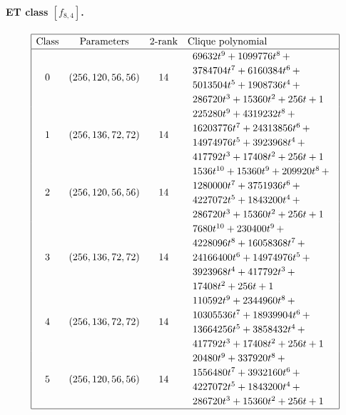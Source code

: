 \documentclass[12pt,a4paper]{article}
\begin{document}
\paragraph*{ET class $[f_{8,4}]$.}
\small{}
\begin{align*}
\def\arraystretch{1.2}
\begin{array}{|cccl|}
\hline
\text{Class} &
\text{Parameters} &
\text{2-rank} &
\text{Clique polynomial}
\\
\hline
0 &
(256, 120, 56, 56) &
14 &
\begin{array}{l}
69632t^{9} + 1099776t^{8}
\,+
\\
 3784704t^{7} + 6160384t^{6}
\,+
\\
 5013504t^{5} + 1908736t^{4}
\,+
\\
 286720t^{3} + 15360t^{2} + 256t + 1
\end{array}
\\
1 &
(256, 136, 72, 72) &
14 &
\begin{array}{l}
225280t^{9} + 4319232t^{8}
\,+
\\
 16203776t^{7} + 24313856t^{6}
\,+
\\
 14974976t^{5} + 3923968t^{4}
\,+
\\
 417792t^{3} + 17408t^{2} + 256t + 1
\end{array}
\\
2 &
(256, 120, 56, 56) &
14 &
\begin{array}{l}
1536t^{10} + 15360t^{9} + 209920t^{8}
\,+
\\
 1280000t^{7} + 3751936t^{6}
\,+
\\
 4227072t^{5} + 1843200t^{4}
\,+
\\
 286720t^{3} + 15360t^{2} + 256t + 1
\end{array}
\\
3 &
(256, 136, 72, 72) &
14 &
\begin{array}{l}
7680t^{10} + 230400t^{9}
\,+
\\
 4228096t^{8} + 16058368t^{7}
\,+
\\
 24166400t^{6} + 14974976t^{5}
\,+
\\
 3923968t^{4} + 417792t^{3}
\,+
\\
 17408t^{2} + 256t + 1
\end{array}
\\
4 &
(256, 136, 72, 72) &
14 &
\begin{array}{l}
110592t^{9} + 2344960t^{8}
\,+
\\
 10305536t^{7} + 18939904t^{6}
\,+
\\
 13664256t^{5} + 3858432t^{4}
\,+
\\
 417792t^{3} + 17408t^{2} + 256t + 1
\end{array}
\\
5 &
(256, 120, 56, 56) &
14 &
\begin{array}{l}
20480t^{9} + 337920t^{8}
\,+
\\
 1556480t^{7} + 3932160t^{6}
\,+
\\
 4227072t^{5} + 1843200t^{4}
\,+
\\
 286720t^{3} + 15360t^{2} + 256t + 1
\end{array}
\\
\hline
\end{array}
\end{align*}
\end{document}

